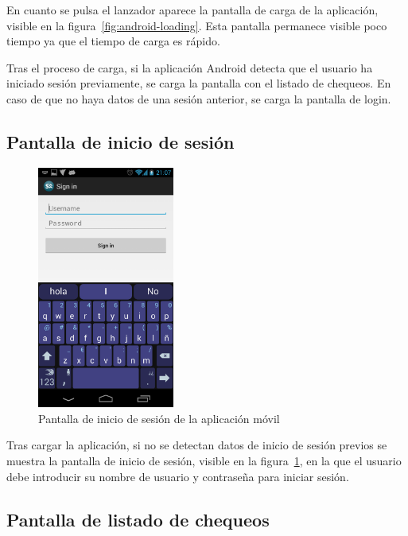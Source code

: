 En cuanto se pulsa el lanzador aparece la pantalla de carga de la aplicación,
visible en la figura~\ref{fig:android-loading}. Esta pantalla permanece visible
poco tiempo ya que el tiempo de carga es rápido.

Tras el proceso de carga, si la aplicación Android detecta que el usuario ha
iniciado sesión previamente, se carga la pantalla con el listado de chequeos. En
caso de que no haya datos de una sesión anterior, se carga la pantalla de login.

\subsection{Pantalla de inicio de sesión}

\begin{figure}[htbp]
  \centering
  \includegraphics[width=0.4\textwidth]{5_diseno/android-3}
  \caption{Pantalla de inicio de sesión de la aplicación móvil}
  \label{fig:android-login}
\end{figure}

Tras cargar la aplicación, si no se detectan datos de inicio de sesión previos
se muestra la pantalla de inicio de sesión, visible en la
figura~\ref{fig:android-login}, en la que el usuario debe introducir su nombre
de usuario y contraseña para iniciar sesión.

\subsection{Pantalla de listado de chequeos}

